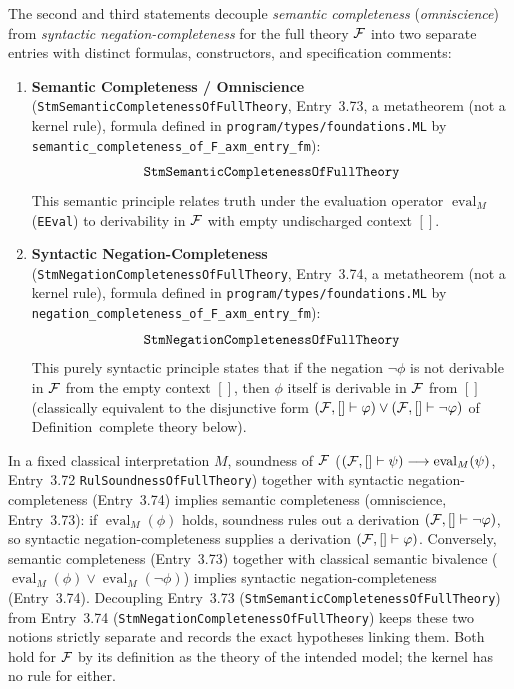 The second and third statements decouple \emph{semantic completeness}
(\emph{omniscience}) from \emph{syntactic negation-completeness} for the full
theory ${\mathcal{F}}$ into two separate entries with distinct formulas, constructors,
and specification comments:
\begin{enumerate}
  \item \textbf{Semantic Completeness / Omniscience} (\texttt{StmSemanticCompletenessOfFullTheory},
  Entry~3.73, a metatheorem (not a kernel rule), formula defined in
  \texttt{program/types/foundations.ML} by \texttt{semantic\_completeness\_of\_F\_axm\_entry\_fm}):
  \[
  \kernelstmt{StmSemanticCompletenessOfFullTheory}
  \]
  This semantic principle relates truth under the evaluation operator
  $\operatorname{eval}_M$ (\texttt{EEval}) to derivability in ${\mathcal{F}}$ with empty
  undischarged context $[]$.
  \item \textbf{Syntactic Negation-Completeness} (\texttt{StmNegationCompletenessOfFullTheory},
  Entry~3.74, a metatheorem (not a kernel rule), formula defined in
  \texttt{program/types/foundations.ML} by \texttt{negation\_completeness\_of\_F\_axm\_entry\_fm}):
  \[
  \kernelstmt{StmNegationCompletenessOfFullTheory}
  \]
  This purely syntactic principle states that if the negation $\neg\phi$ is not
  derivable in ${\mathcal{F}}$ from the empty context $[]$, then $\phi$ itself is derivable
  in ${\mathcal{F}}$ from $[]$ (classically equivalent to the disjunctive form
  $({\mathcal{F}}, [] \vdash \varphi) \lor ({\mathcal{F}}, [] \vdash \neg\varphi)$ of Definition~complete theory below).
\end{enumerate}
In a fixed classical interpretation $M$, soundness of ${\mathcal{F}}$
($({\mathcal{F}}, [] \vdash \psi) \longrightarrow \operatorname{eval}_M(\psi)$, Entry~3.72 \texttt{RulSoundnessOfFullTheory}) together with
syntactic negation-completeness (Entry~3.74) implies semantic completeness (omniscience, Entry~3.73): if
$\operatorname{eval}_M(\phi)$ holds, soundness rules out a derivation
$({\mathcal{F}}, [] \vdash \neg\varphi)$, so syntactic negation-completeness supplies a
derivation $({\mathcal{F}}, [] \vdash \varphi)$. Conversely, semantic completeness (Entry~3.73) together
with classical semantic bivalence ($\operatorname{eval}_M(\phi) \lor \operatorname{eval}_M(\neg\phi)$)
implies syntactic negation-completeness (Entry~3.74). Decoupling Entry~3.73
(\texttt{StmSemanticCompletenessOfFullTheory}) from Entry~3.74
(\texttt{StmNegationCompletenessOfFullTheory})
keeps these two notions strictly separate and records the exact hypotheses linking them.
Both hold for ${\mathcal{F}}$ by its definition as the theory of the intended model; the kernel has no
rule for either.

